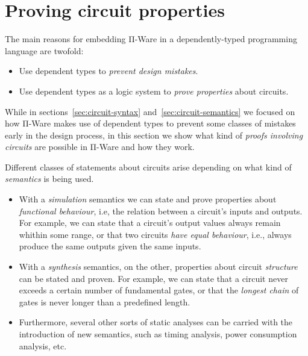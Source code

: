     \section{Proving circuit properties}
    \label{sec:proving-circuit-properties}

        The main reasons for embedding Π-Ware in a dependently-typed programming language are twofold:

        \begin{itemize}
            \item Use dependent types to \emph{prevent design mistakes}.
            \item Use dependent types as a logic system to \emph{prove properties} about circuits.
        \end{itemize}

        While in sections~\ref{sec:circuit-syntax} and~\ref{sec:circuit-semantics} we focused on
        how Π-Ware makes use of dependent types to prevent some classes of mistakes early in the design process,
        in this section we show what kind of \emph{proofs involving circuits} are possible in Π-Ware
        and how they work.

        Different classes of statements about circuits arise depending on what kind of
        \emph{semantics} is being used.

        \begin{itemize}
            \item With a \emph{simulation} semantics we can state and prove properties about
                \emph{functional behaviour}, i.e, the relation between a circuit's inputs and outputs.
                For example, we can state that a circuit's output values always remain whithin some range,
                or that two circuits \emph{have equal behaviour}, i.e., always produce the same outputs
                given the same inputs.
            \item With a \emph{synthesis} semantics, on the other, properties about circuit \emph{structure}
                can be stated and proven. For example, we can state that a circuit never
                exceeds a certain number of fundamental gates,
                or that the \emph{longest chain} of gates is never longer than a predefined length.
            \item Furthermore, several other sorts of static analyses can be carried with the
                introduction of new semantics, such as timing analysis, power consumption analysis, etc.
        \end{itemize}

